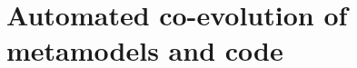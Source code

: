 
\clearemptydoublepage
\chapter{Automated co-evolution of metamodels and code}
\label{autocoevol}










